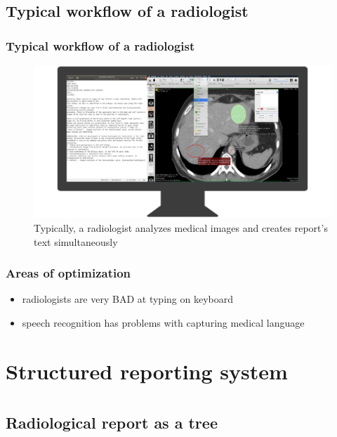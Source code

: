 \documentclass{beamer}
\begin{document}
\subsection{Typical workflow of a radiologist}
\begin{frame}
\frametitle{Typical workflow of a radiologist}
\begin{figure}
	\centering
	\includegraphics[width=1\linewidth]{../workspace}
	\caption{Typically, a radiologist analyzes medical images and creates report's text simultaneously}
	\label{fig:workspace}
\end{figure}
\end{frame}

\begin{frame}
\frametitle{Areas of optimization}
\begin{itemize}
	\item radiologists are \alert{very BAD} at typing on keyboard
	\item speech recognition has problems with capturing medical language
	\
\end{itemize}
\end{frame}

\section{Structured reporting system}



\section{}
\subsection{Radiological report as a tree}
\end{document}
